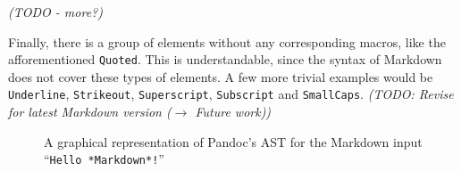 \documentclass[
  digital,     %
  oneside,     %
  nosansbold,  %
  nocolorbold, %
  lof,         %
  lot,         %
]{fithesis4}
\begin{document}
\emph{(TODO - more?)}

Finally, there is a group of elements without any corresponding macros, like the afforementioned \texttt{Quoted}. This is understandable, since the syntax of Markdown does not cover these types of elements. A few more trivial examples would be \texttt{Underline}, \texttt{Strikeout}, \texttt{Superscript}, \texttt{Subscript} and \texttt{SmallCaps}. \emph{(TODO: Revise for latest Markdown version ($\rightarrow$ Future work))}

\begin{figure}
  \centering
  \caption{A graphical representation of Pandoc's AST for the Markdown input ``\texttt{Hello *Markdown*!}''}
  \label{fig:pandoc-ast}
\end{figure}

\end{document}
